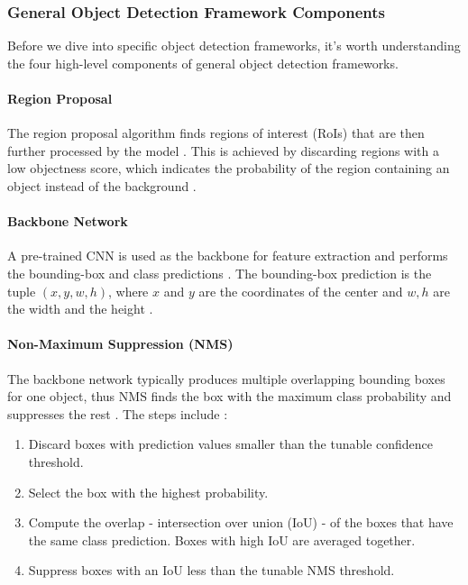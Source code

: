 \documentclass[a4paper, 11pt, oneside]{article}
\begin{document}
\subsubsection{General Object Detection Framework Components}

\label{sec:generalobjectdetection}

Before we dive into specific object detection frameworks, it's worth understanding the four high-level components of
general object detection frameworks.

\paragraph{Region Proposal}

The region proposal algorithm finds regions of interest (RoIs) that are then further processed by the model
\cite{elgendy2020deep}. This is achieved by discarding regions with a low objectness score, which indicates the probability
of the region containing an object instead of the background \cite{elgendy2020deep}.

\paragraph{Backbone Network}

A pre-trained CNN is used as the backbone for feature extraction and performs the bounding-box and class predictions
\cite{elgendy2020deep}. The bounding-box prediction is the tuple $(x, y, w, h)$, where $x$ and $y$ are the coordinates
of the center and $w, h$ are the width and the height \cite{elgendy2020deep}.

\paragraph{Non-Maximum Suppression (NMS)}

The backbone network typically produces multiple overlapping bounding boxes for one object, thus NMS finds
the box with the maximum class probability and suppresses the rest \cite{elgendy2020deep}. The steps include
\cite{elgendy2020deep}:

\begin{enumerate}
  \item Discard boxes with prediction values smaller than the tunable confidence threshold.
  \item Select the box with the highest probability.
  \item Compute the overlap - intersection over union (IoU) - of the boxes that have the same class prediction.
  Boxes with high IoU are averaged together.
  \item Suppress boxes with an IoU less than the tunable NMS threshold.
\end{enumerate}
\end{document}
